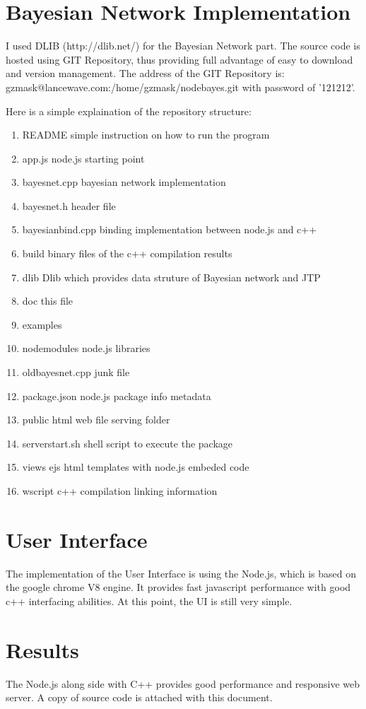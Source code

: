 \documentclass[12pt]{article}
\begin{document}
\section{Bayesian Network Implementation}
I used DLIB (http://dlib.net/) for the Bayesian Network part. The source code is hosted using GIT Repository, thus providing full advantage of easy to download and version management. The address of the GIT Repository is: gzmask@lancewave.com:/home/gzmask/nodebayes.git with password of '121212'.

Here is a simple explaination of the repository structure:
\begin{enumerate}
	\item README simple instruction on how to run the program
	\item app.js node.js starting point
	\item bayesnet.cpp bayesian network implementation
	\item bayesnet.h header file
	\item bayesianbind.cpp binding implementation between node.js and c++
	\item build binary files of the c++ compilation results
	\item dlib Dlib which provides data struture of Bayesian network and JTP
	\item doc this file
	\item examples 
	\item nodemodules node.js libraries
	\item oldbayesnet.cpp junk file
	\item package.json node.js package info metadata
	\item public html web file serving folder
	\item serverstart.sh shell script to execute the package
	\item views ejs html templates with node.js embeded code
	\item wscript c++ compilation linking information
\end{enumerate}

\section{User Interface}
The implementation of the User Interface is using the Node.js, which is based on the google chrome V8 engine. It provides fast javascript performance with good c++ interfacing abilities. At this point, the UI is still very simple.

\section{Results}\label{results}
The Node.js along side with C++ provides good performance and responsive web server.
A copy of source code is attached with this document.




\end{document}
